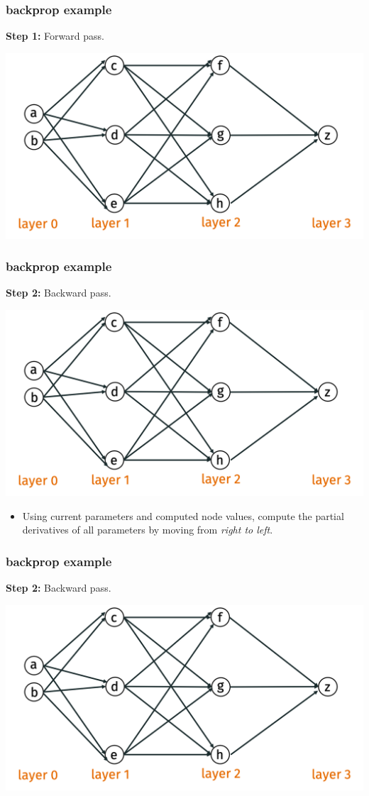 \documentclass[handout,compress]{beamer}
\begin{document}
\begin{frame}[t]
	\frametitle{backprop example}
	\textbf{Step 1:} Forward pass. 
	
		\includegraphics[width=.5\textwidth]{backpro_example.png}
\end{frame}

\begin{frame}
	\frametitle{backprop example}
	\textbf{Step 2:} Backward pass. 
	\begin{center}
		\vspace{-.5em}
		\includegraphics[width=.6\textwidth]{backpro_example.png}
		\vspace{-1em}
	\end{center}
	\begin{itemize}
		\item Using current parameters and computed node values, compute the partial derivatives of all parameters by moving from \emph{right to left}.
	\end{itemize}	
\end{frame}

\begin{frame}[t]
	\frametitle{backprop example}
	\textbf{Step 2:} Backward pass.  
	
	\includegraphics[width=.5\textwidth]{backpro_example.png}
\end{frame}
\end{document}
